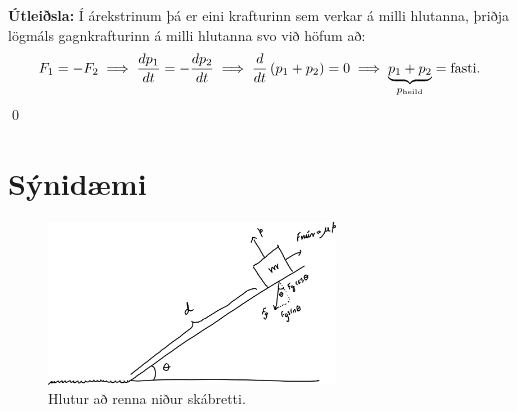 \textbf{Útleiðsla:} Í árekstrinum þá er eini krafturinn sem verkar á milli hlutanna, þriðja lögmáls gagnkrafturinn á milli hlutanna svo við höfum að:
\begin{align*}
    F_{1} = -F_{2} \implies \frac{dp_1}{dt} = -\frac{dp_2}{dt} \implies \frac{d}{dt}\left( p_1 + p_2 \right) = 0 \implies \underbrace{p_1 + p_2}_\textrm{$p_{\text{heild}}$} = \text{fasti}.
\end{align*}
\qed

\section{Sýnidæmi}


\begin{minipage}{\linewidth}
\begin{figure}
\vspace{-1cm}
\includegraphics[width=3in]{temp/fnun.pdf}
\caption{Hlutur að renna niður skábretti.}
\label{fig:fnun}
\end{figure}


\end{minipage}
